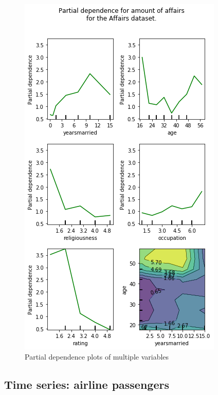 \documentclass[a4paper, 10pt, conference]{ieeeconf}
\begin{document}
\begin{figure}[!ht]
    \centering
    \includegraphics[width=\linewidth]{report/images/pdp.png}
    \caption{Partial dependence plots of multiple variables}
    \label{fig:pdp}
\end{figure}

\label{subsec:reg_affairs}
\subsection{Time series: airline passengers}
\label{subsec:ts_airpas}
\end{document}
